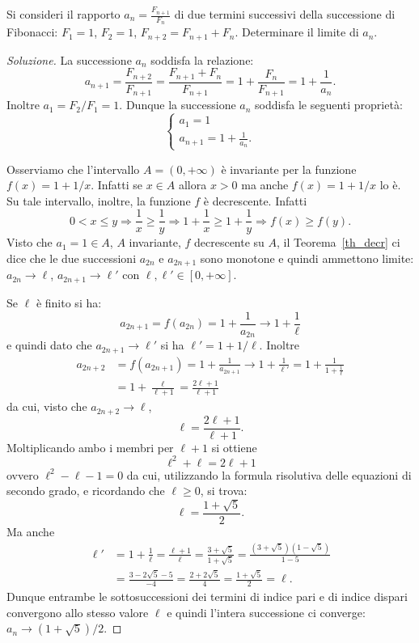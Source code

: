 \documentclass[italian,a4paper]{scrartcl}
\begin{document}
\begin{exercise}[Fibonacci]\label{ex_fibonacci}
  Si consideri il rapporto $a_n = \frac{F_{n+1}}{F_n}$ di due termini
  successivi della successione di Fibonacci: $F_1=1$, $F_2=1$,
  $F_{n+2} = F_{n+1} + F_n$. Determinare il limite di $a_n$.
\end{exercise}

\begin{proof}[Soluzione]
  La successione $a_n$ soddisfa la relazione:
  \[
   a_{n+1} = \frac{F_{n+2}}{F_{n+1}} = \frac{F_{n+1}+F_n}{F_{n+1}} = 1
   + \frac{F_n}{F_{n+1}} = 1 + \frac{1}{a_n}.
   \]
   Inoltre $a_1=F_2 / F_1 = 1$. Dunque la successione $a_n$ soddisfa
   le seguenti proprietà:
   \[
   \begin{cases}
     a_1 = 1 \\
     a_{n+1} = 1 + \frac{1}{a_n}.
   \end{cases}
   \]

   Osserviamo che l'intervallo $A=(0,+\infty)$ è invariante per la
   funzione $f(x) = 1+1/x$. Infatti
   se $x\in A$ allora $x>0$ ma anche $f(x) = 1+1/x$ lo è.
   Su tale intervallo, inoltre, la funzione $f$ è decrescente. Infatti
   \[
   0 < x \le y \Rightarrow \frac 1 x \ge \frac 1 y \Rightarrow 1+\frac
   1 x \ge 1 + \frac 1 y
   \Rightarrow f(x) \ge f(y).
   \]
   Visto che $a_1 = 1 \in A$, $A$ invariante, $f$ decrescente su $A$,
   il Teorema~\ref{th_decr} ci dice che le due successioni $a_{2n}$ e
   $a_{2n+1}$ sono monotone e quindi ammettono limite: $a_{2n}\to
   \ell$, $a_{2n+1} \to \ell'$ con $\ell,\ell' \in [0,+\infty]$.

   Se $\ell$ è finito si ha:
   \[
   a_{2n+1} = f(a_{2n}) = 1+ \frac{1}{a_{2n}} \to 1 + \frac{1}{\ell}
   \]
   e quindi dato che $a_{2n+1}\to \ell'$ si ha $\ell' = 1 + 1/\ell$.
   Inoltre
   \begin{align*}
   a_{2n+2} &= f(a_{2n+1}) = 1 + \frac{1}{a_{2n+1}} \to 1 +
   \frac{1}{\ell'}
   = 1 + \frac{1}{1+\frac{1}{\ell}} \\
   & = 1 + \frac{\ell}{\ell+1}
   = \frac{2\ell +1}{\ell +1}
   \end{align*}
   da cui, visto che $a_{2n+2}\to \ell$,
   \[
   \ell = \frac{2\ell +1 }{\ell +1}.
   \]
   Moltiplicando ambo i membri per $\ell+1$ si ottiene
   \[
    \ell^2 + \ell = 2\ell + 1
    \]
    ovvero $\ell^2 - \ell -1 =0$ da cui, utilizzando la formula
    risolutiva delle equazioni di secondo grado, e ricordando che
    $\ell \ge 0$, si trova:
    \[
    \ell = \frac{1 + \sqrt{5}}{2}.
    \]
    Ma anche
    \begin{align*}
    \ell' &= 1 + \frac 1 \ell = \frac{\ell + 1}{\ell} = \frac{3+\sqrt
      5}{1 + \sqrt 5} = \frac{(3+\sqrt 5)(1-\sqrt 5)}{1-5} \\
     &= \frac{3-2\sqrt 5-5}{-4} = \frac{2+2\sqrt 5}{4} = \frac{1+\sqrt
       5}{2} = \ell.
    \end{align*}
    Dunque entrambe le sottosuccessioni dei termini di indice pari e
    di indice dispari convergono allo stesso valore $\ell$ e quindi
    l'intera successione ci converge: $a_n\to (1+\sqrt 5)/2$.


\end{proof}
\end{document}
